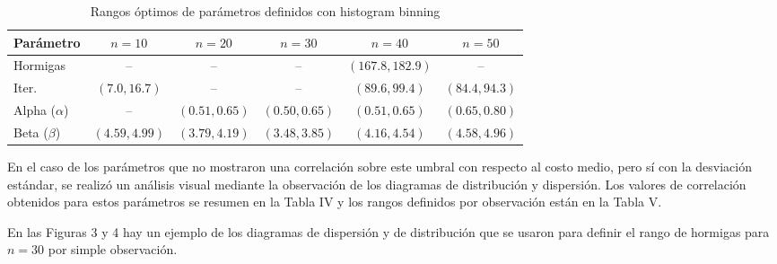 \documentclass[conference]{IEEEtran}
\begin{document}
\begin{table}[h]
\centering
\setlength{\tabcolsep}{2pt}
\begin{tabular}{|l|c|c|c|c|c|}
\hline
Parámetro & $n=10$ & $n=20$ & $n=30$ & $n=40$ & $n=50$ \\
\hline
Hormigas & -- & -- & -- & $(167.8, 182.9)$ & -- \\
\hline
Iter. & $(7.0, 16.7)$ & -- & -- & $(89.6, 99.4)$ & $(84.4, 94.3)$ \\
\hline
Alpha ($\alpha$) & -- & $(0.51, 0.65)$ & $(0.50, 0.65)$ & $(0.51, 0.65)$ & $(0.65, 0.80)$ \\
\hline
Beta ($\beta$) & $(4.59, 4.99)$ & $(3.79, 4.19)$ & $(3.48, 3.85)$ & $(4.16, 4.54)$ & $(4.58, 4.96)$ \\
\hline
\end{tabular}
\caption{Rangos óptimos de parámetros definidos con histogram binning}
\label{tab:table2}
\end{table}

En el caso de los parámetros que no mostraron una correlación sobre este umbral con respecto al costo medio, pero sí con la desviación estándar, se realizó un análisis visual mediante la observación de los diagramas de distribución y dispersión. Los valores de correlación obtenidos para estos parámetros se resumen en la Tabla IV y los rangos definidos por observación están en la Tabla V.

\begin{table}[h]
  \centering
  \caption{Correlaciones de parámetros con la desviación estándar del costo}
  \label{tab:table1}
\end{table}

En las Figuras 3 y 4 hay un ejemplo de los diagramas de dispersión y de distribución que se usaron para definir el rango de hormigas para $n=30$ por simple observación.
\end{document}
